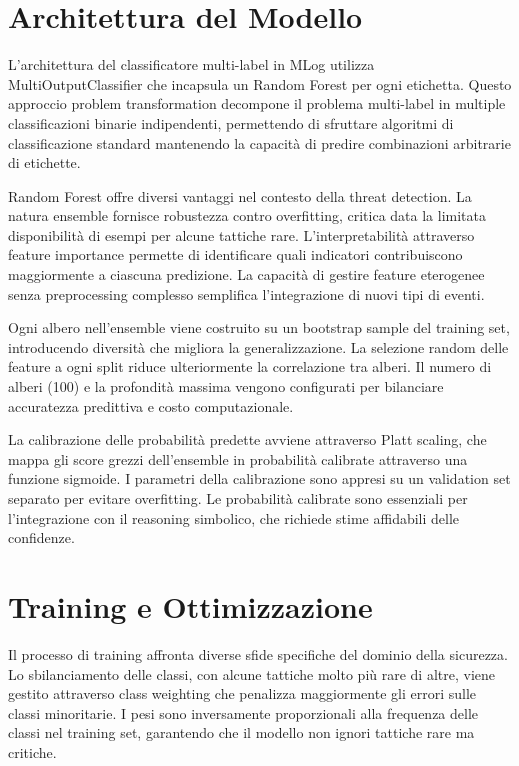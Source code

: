 \documentclass[12pt,a4paper]{report}
\theoremstyle{definition}
\begin{document}
\section{Architettura del Modello}

L'architettura del classificatore multi-label in MLog utilizza MultiOutputClassifier che incapsula un Random Forest per ogni etichetta. Questo approccio problem transformation decompone il problema multi-label in multiple classificazioni binarie indipendenti, permettendo di sfruttare algoritmi di classificazione standard mantenendo la capacità di predire combinazioni arbitrarie di etichette.

Random Forest offre diversi vantaggi nel contesto della threat detection. La natura ensemble fornisce robustezza contro overfitting, critica data la limitata disponibilità di esempi per alcune tattiche rare. L'interpretabilità attraverso feature importance permette di identificare quali indicatori contribuiscono maggiormente a ciascuna predizione. La capacità di gestire feature eterogenee senza preprocessing complesso semplifica l'integrazione di nuovi tipi di eventi.

Ogni albero nell'ensemble viene costruito su un bootstrap sample del training set, introducendo diversità che migliora la generalizzazione. La selezione random delle feature a ogni split riduce ulteriormente la correlazione tra alberi. Il numero di alberi (100) e la profondità massima vengono configurati per bilanciare accuratezza predittiva e costo computazionale.

La calibrazione delle probabilità predette avviene attraverso Platt scaling, che mappa gli score grezzi dell'ensemble in probabilità calibrate attraverso una funzione sigmoide. I parametri della calibrazione sono appresi su un validation set separato per evitare overfitting. Le probabilità calibrate sono essenziali per l'integrazione con il reasoning simbolico, che richiede stime affidabili delle confidenze.

\section{Training e Ottimizzazione}

Il processo di training affronta diverse sfide specifiche del dominio della sicurezza. Lo sbilanciamento delle classi, con alcune tattiche molto più rare di altre, viene gestito attraverso class weighting che penalizza maggiormente gli errori sulle classi minoritarie. I pesi sono inversamente proporzionali alla frequenza delle classi nel training set, garantendo che il modello non ignori tattiche rare ma critiche.
\end{document}
